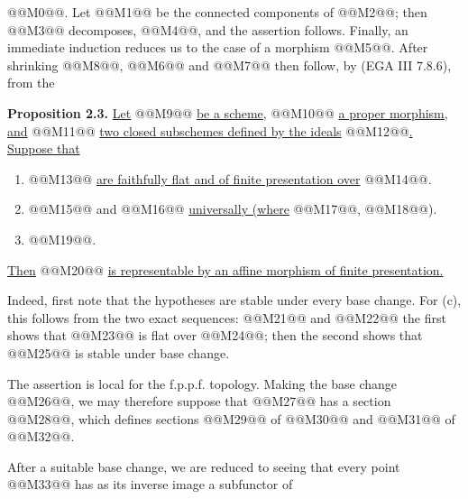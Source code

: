 @@M0@@. Let @@M1@@ be the connected components of @@M2@@; then @@M3@@ decomposes, @@M4@@, and the assertion follows. Finally, an immediate induction reduces us to the case of a morphism @@M5@@. After shrinking @@M8@@, @@M6@@ and @@M7@@ then follow, by (EGA III 7.8.6), from the

\textbf{Proposition 2.3.} \uline{Let} @@M9@@ \uline{be a scheme,} @@M10@@ \uline{a proper morphism, and} @@M11@@ \uline{two closed subschemes defined by the ideals} @@M12@@\uline{. Suppose that}
\begin{enumerate}[label=\alph*)]
\item @@M13@@ \uline{are faithfully flat and of finite presentation over} @@M14@@.
\item @@M15@@ and @@M16@@ \uline{universally (where} @@M17@@, @@M18@@).
\item @@M19@@.
\end{enumerate}
\uline{Then} @@M20@@ \uline{is representable by an affine morphism of finite presentation.}

Indeed, first note that the hypotheses are stable under every base change. For (c), this follows from the two exact sequences:
@@M21@@
and
@@M22@@
the first shows that @@M23@@ is flat over @@M24@@; then the second shows that @@M25@@ is stable under base change.

The assertion is local for the f.p.p.f. topology. Making the base change @@M26@@, we may therefore suppose that @@M27@@ has a section @@M28@@, which defines sections @@M29@@ of @@M30@@ and @@M31@@ of @@M32@@.

After a suitable base change, we are reduced to seeing that every point @@M33@@ has as its inverse image a subfunctor of

